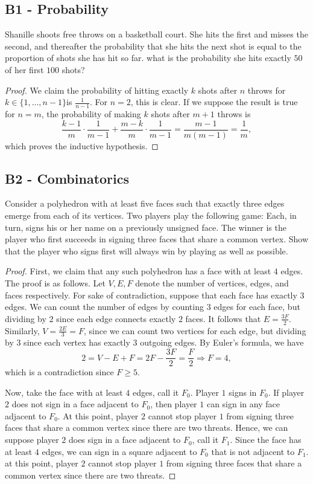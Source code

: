 \documentclass[11pt]{scrartcl}
\newcommand{\<}{\langle}
\renewcommand{\>}{\rangle}
\begin{document}
\subsection{B1 - Probability}
Shanille shoots free throws on a basketball court.  She hits the first and misses the second, and thereafter the probability that she hits the next shot is equal to the proportion of shots she has hit so far.  what is the probability she hits exactly $50$ of her first $100$ shots?
\begin{proof}
We claim the probability of hitting exactly $k$ shots after $n$ throws for $k \in \{1, \dots, n-1\}$is $\frac{1}{n-1}$.  For $n = 2$, this is clear.  If we suppose the result is true for $n = m$, the probability of making $k$ shots after $m + 1$ throws is 
$$\frac{k-1}{m} \cdot \frac{1}{m-1} + \frac{m - k}{m} \cdot \frac{1}{m-1} = \frac{m-1}{m(m-1)} = \frac{1}{m},$$
which proves the inductive hypothesis.  

\end{proof}
\pagebreak
\subsection{B2 - Combinatorics}
Consider a polyhedron with at least five faces such that exactly three edges emerge from each of its vertices. Two players play the following game: Each, in turn, signs his or her name on a previously unsigned face. The winner is the player who first succeeds in signing three faces that share a common vertex. Show that the player who signs first will always win by playing as well as possible.
\begin{proof}
First, we claim that any such polyhedron has a face with at least $4$ edges.  The proof is as follows.  Let $V, E, F$ denote the number of vertices, edges, and faces respectively.  For sake of contradiction, suppose that each face has exactly $3$ edges.  We can count the number of edges by counting $3$ edges for each face, but dividing by $2$ since each edge connects exactly $2$ faces.  It follows that $E = \frac{3F}{2}$.  Similarly, $V = \frac{2E}{3} = F$, since we can count two vertices for each edge, but dividing by $3$ since each vertex has exactly $3$ outgoing edges.  By Euler's formula, we have 
$$2 = V - E + F = 2F - \frac{3F}{2} = \frac{F}{2} \Longrightarrow F = 4,$$
which is a contradiction since $F \ge 5$.  

Now, take the face with at least $4$ edges, call it $F_0$.  Player $1$ signs in $F_0$.  If player $2$ does not sign in a face adjacent to $F_0$, then player $1$ can sign in any face adjacent to $F_0$.  At this point, player $2$ cannot stop player $1$ from signing three faces that share a common vertex since there are two threats.  Hence, we can suppose player $2$ does sign in a face adjacent to $F_0$, call it $F_1$.  Since the face has at least $4$ edges, we can sign in a square adjacent to $F_0$ that is not adjacent to $F_1$.  at this point, player $2$ cannot stop player $1$ from signing three faces that share a common vertex since there are two threats.  
\end{proof}
\end{document}
